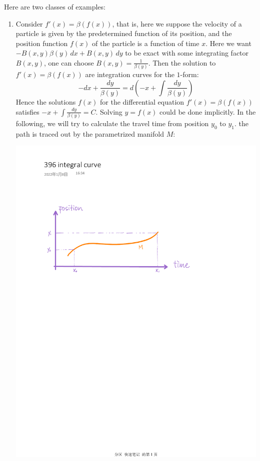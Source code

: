 \documentclass[11pt,oneside]{book}
\theoremstyle{break}
\theoremstyle{break}
\begin{document}
Here are two classes of examples:
\begin{enumerate}
\item Consider $f'(x) = \beta(f(x))$, that is, here we suppose the velocity of a particle is given by the predetermined function of its position, and the position function $f(x)$ of the particle is a function of time $x$. Here we want $-B(x,y) \beta(y)\, dx + B(x,y)\, dy$ to be exact with some integrating factor $B(x,y)$, one can choose $B(x,y) = \frac{1}{\beta (y)}$. Then the solution to  $f'(x) = \beta(f(x))$ are integration curves for the $1$-form: $$-dx + \frac{dy}{\beta(y)} = d\left(-x + \int \frac{dy}{\beta(y)}\right)$$ Hence the solutions $f(x)$ for the differential equation $f'(x) = \beta(f(x))$ satisfies $-x + \int \frac{dy}{\beta(y)} = C$. Solving $y = f(x)$ could be done implicitly. In the following, we will try to calculate the travel time from position $y_0$ to $y_1$. the path is traced out by the parametrized manifold $M$: 
\begin{center}
\includegraphics[scale=0.75]{integralCurve.pdf}

\end{center}
\end{enumerate}
\end{document}

